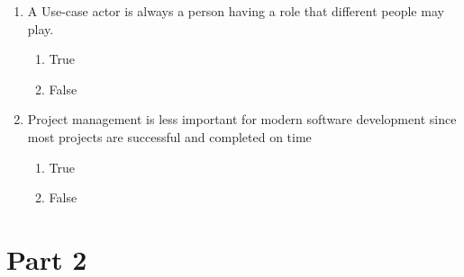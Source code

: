\documentclass[12pt]{article}
\newcommand{\answeritem}{\global\answertrue\item}
\newcommand{\perhapsanswer}{%
  \ifanswer
    $\blacksquare$ \global\answerfalse
  \else
    $\square$ \global\answerfalse
  \fi
}
\newif\ifanswer
\begin{document}
\begin{enumerate}
    \item A Use-case actor is always a person having a role that different people may play.
    \begin{enumerate}[start=1,align=left,label={\protect\perhapsanswer(\alph*)}]
      \item True
      \answeritem False
    \end{enumerate}

    \item Project management is less important for modern software development since most projects are successful and completed on time
    \begin{enumerate}[start=1,align=left,label={\protect\perhapsanswer(\alph*)}]
      \answeritem True
      \item False
    \end{enumerate}

  \end{enumerate}

  \section*{Part 2}
\end{document}

